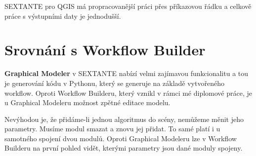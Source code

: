 SEXTANTE pro QGIS má propracovanější práci přes příkazovou řádku a celkově práce s výstupními daty je jednodušší.

\section{Srovnání s Workflow Builder}

\textbf{Graphical Modeler} v SEXTANTE nabízí velmi zajímavou funkcionalitu a tou je generování kódu v Pythonu, který se generuje na základě vytvořeného workflow. Oproti Workflow Builderu, který vznikl v rámci mé diplomové práce, je u Graphical Modeleru možnost zpětné editace modelu.

Nevýhodou je, že přidáme-li jednou algoritmus do scény, nemůžeme měnit jeho parametry. Musíme modul smazat a znovu jej přidat. To samé platí i u samotného spojení dvou modulů. Oproti Graphical Modeleru lze v Workflow Builderu na první pohled vidět, kterými parametry jsou dané moduly spojeny. 